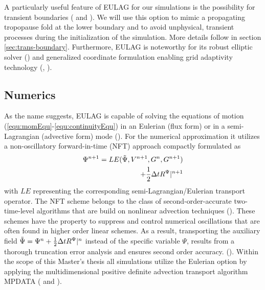 A particularly useful feature of EULAG for our simulations is the possibility for transient boundaries (\cite[]{prusa_propagation_1996} and \cite{wedi_extending_2003}). We will use this option to mimic a propagating tropopause fold at the lower boundary and to avoid unphysical, transient processes during the initialization of the simulation. More details follow in section \ref{sec:trans-boundary}. Furthermore, EULAG is noteworthy for its robust elliptic solver (\cite{smolarkiewicz_forward--time_1993}) and generalized coordinate formulation enabling grid adaptivity technology (\cite{prusa_eulag_2008}, \cite{kuhnlein_modelling_2012}).

\subsection*{Numerics}
As the name suggests, EULAG is capable of solving the equations of motion (\ref{equ:momEqu}-\ref{equ:continuityEqu}) in an Eulerian (flux form) or in a semi-Lagrangian (advective form) mode (\cite{smolarkiewicz_forward--time_1997}). For the numerical approximation it utilizes a non-oscillatory forward-in-time (NFT) approach compactly formulated as
\begin{equation}
\begin{aligned}
    \Psi^{n+1} = LE(\Tilde{\Psi}, V^{n+1}, G^n, G^{n+1}) \\
    + \frac{1}{2} \Delta t R^{\Psi} |^{n+1}
    \label{equ:NFTscheme}
\end{aligned}
\end{equation}
with $LE$ representing the corresponding semi-Lagrangian/Eulerian transport operator. The NFT scheme belongs to the class of second-order-accurate two-time-level algorithms that are build on nonlinear advection techniques (\cite{prusa_eulag_2008}). These schemes have the property to suppress and control numerical oscillations that are often found in higher order linear schemes. As a result, transporting the auxiliary field $\Tilde{\Psi} = \Psi^n + \frac{1}{2} \Delta t R^{\Psi}|^n$ instead of the specific variable $\Psi$, results from a thorough truncation error analysis and ensures second order accuracy. (\cite{smolarkiewicz_forward--time_1997}). Within the scope of this Master's thesis all simulations utilize the Eulerian option by applying the multidimensional positive definite advection transport algorithm MPDATA (\cite{smolarkiewicz_mpdata_1998} and \cite{smolarkiewicz_multidimensional_2006}).


